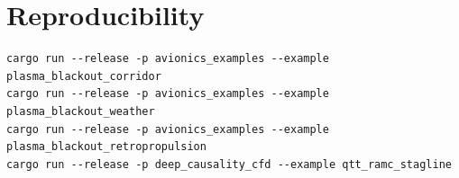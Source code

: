 \section{Reproducibility}
\label{app:repro}


\begin{lstlisting}[language={},numbers=none,caption={\placeholder{caption}},label={lst:repro}]
cargo run --release -p avionics_examples --example plasma_blackout_corridor
cargo run --release -p avionics_examples --example plasma_blackout_weather
cargo run --release -p avionics_examples --example plasma_blackout_retropropulsion
cargo run --release -p deep_causality_cfd --example qtt_ramc_stagline
\end{lstlisting}

